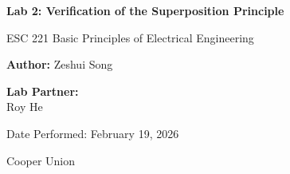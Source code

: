 \documentclass[12pt]{article}
\title{}
\date{}
\author{}
\begin{document}
\begin{titlepage}
    \centering
    \vspace*{1in}

    {\Large\bfseries Lab 2: Verification of the Superposition Principle \par}
    \vspace{1.5cm}

    {\large ESC 221 Basic Principles of Electrical Engineering \par}
    \vspace{2cm}

    {\large \textbf{Author:} Zeshui Song \par}
    \vspace{0.5cm}

    {\large \textbf{Lab Partner:}} \\
    Roy He
    \vfill

    {\large Date Performed: February 19, 2026 \par}
    \vspace{0.8cm}

    {\large Cooper Union \par}

    \vspace*{1in}
\end{titlepage}
\newpage
\end{document}

